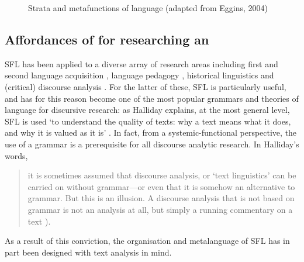 \begin{figure}[htb]
\centering
{}
\caption[Strata and metafunctions of language]{Strata and metafunctions of language (adapted from Eggins, 2004)}
\label{fig:eggins}
\end{figure}

\subsection{Affordances of  for researching an }

\gls{SFL} has been applied to a diverse array of research areas including first and second language acquisition \cite{halliday1993towards,hasan_learning_1994}, language pedagogy \cite{halliday_towards_1993}, historical linguistics \cite{cummings2010introduction,martin_re/reading_2003} and (critical) discourse analysis \cite{hunston_systemic_2013,le_systematic_2009,martin_working_2003}. For the latter of these, \gls{SFL} is particularly useful, and has for this reason become one of the most popular grammars and theories of language for discursive research: as Halliday explains, at the most general level, \gls{SFL} is used `to understand the quality of texts: why a text means what it does, and why it is valued as it is' \parencite*[p.~xxx]{halliday_introduction:_2004}. In fact, from a systemic\hyp{}functional perspective, the use of a grammar is a prerequisite for all discourse analytic research. In Halliday's words,

\begin{quote}\small\singlespacing
it is sometimes assumed that discourse analysis, or `text linguistics' can be carried on without grammar---or even that it is somehow an alternative to grammar. But this is an illusion. A discourse analysis that is not based on grammar is not an analysis at all, but simply a running commentary on a text \parencite*[p.~xvii]{halliday_introduction:_2004}).
\end{quote}
%
As a result of this conviction, the organisation and metalanguage of \gls{SFL} has in part been designed with text analysis in mind.

